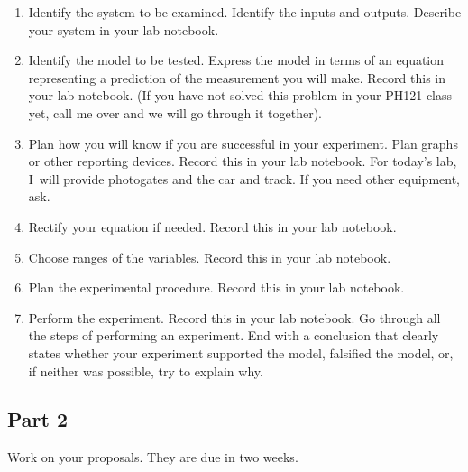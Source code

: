 \documentclass[twoside,11pt,ShortChapTitles]{BYUTextbook}
\begin{document}
\begin{enumerate}
\item Identify the system to be examined. Identify the inputs and outputs.
Describe your system in your lab notebook.

\item Identify the model to be tested. Express the model in terms of an
equation representing a prediction of the measurement you will make. Record
this in your lab notebook. (If you have not solved this problem in your
PH121 class yet, call me over and we will go through it together).

\item Plan how you will know if you are successful in your experiment. Plan
graphs or other reporting devices. Record this in your lab notebook. For
today's lab, I\ will provide photogates and the car and track. If you need
other equipment, ask.

\item Rectify your equation if needed. Record this in your lab notebook.

\item Choose ranges of the variables. Record this in your lab notebook.

\item Plan the experimental procedure. Record this in your lab notebook.

\item Perform the experiment. Record this in your lab notebook. Go through
all the steps of performing an experiment. End with a conclusion that
clearly states whether your experiment supported the model, falsified the
model, or, if neither was possible, try to explain why.
\end{enumerate}

\subsection{Part 2}

Work on your proposals. They are due in two weeks. 
\end{document}
